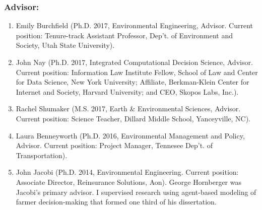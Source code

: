 \documentclass[10pt]{article}
\begin{document}
    \subsubsection{Advisor:}
    \begin{enumerate}
	\item Emily Burchfield (Ph.D. 2017, Environmental Engineering, Advisor. Current position: Tenure-track Assistant Professor, Dep't. of Environment and Society, Utah State University).
	\item John Nay (Ph.D. 2017, Integrated Computational Decision Science, Advisor. Current position: Information Law Institute Fellow, School of Law and Center for Data Science, New York University; Affiliate, Berkman-Klein Center for Internet and Society, Harvard University; and CEO, Skopos Labs, Inc.).
	\item Rachel Shumaker (M.S. 2017, Earth \& Environmental Sciences, Advisor. Current position: Science Teacher, Dillard Middle School, Yanceyville, NC).
	\item Laura Benneyworth (Ph.D. 2016, Environmental Management and Policy, Advisor. Current position: Project Manager, Tennesee Dep't. of Transportation).
	\item John Jacobi (Ph.D. 2014, Environmental Engineering. Current position: Associate Director, Reinsurance Solutions, Aon). George Hornberger was Jacobi's primary advisor. I supervised research using agent-based modeling of farmer decision-making that formed one third of his dissertation.
    \end{enumerate}
\end{document}
